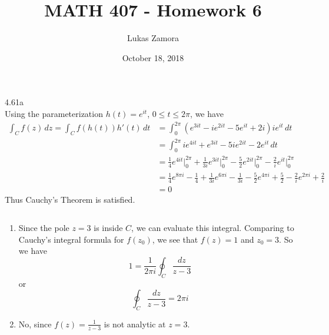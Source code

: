 \documentclass{article}
\title{MATH 407 - Homework 6}
\author{Lukas Zamora}
\date{October 18, 2018}
\theoremstyle{definition}
\begin{document}
    \maketitle
    
    \begin{prob}{4.61a} $  $ \vspace{2mm} \\ 
    	Using the parameterization $ h(t) = e^{it} $, $ 0 \leq t \leq 2\pi $, we have
    	\begin{align*}
    		\int_C f(z) \, dz = \int_C f(h(t))h'(t) \, dt &= \int_{0}^{2\pi} \left( e^{3it} - ie^{2it} - 5e^{it} + 2i \right) ie^{it} \, dt \\
    		&= \int_{0}^{2\pi} ie^{4it} + e^{3it} - 5ie^{2it} - 2e^{it} \, dt \\
    		&= \frac{1}{4} e^{4it} \Big|_{0}^{2\pi} + \frac{1}{3i} e^{3it} \Big|_{0}^{2\pi} - \frac{5}{2} e^{2it} \Big|_{0}^{2\pi} - \frac{2}{i} e^{it} \Big|_{0}^{2\pi} \\
    		&= \frac{1}{4} e^{8\pi i} - \frac{1}{4} + \frac{1}{3i} e^{6\pi i} - \frac{1}{3i} - \frac{5}{2} e^{4\pi i} + \frac{5}{2} - \frac{2}{i} e^{2\pi i} + \frac{2}{i} \\
    		&= 0
    	\end{align*}
    	Thus Cauchy's Theorem is satisfied. \\
    \end{prob}


	\begin{prob}{4.62} $  $
		\begin{enumerate}[label=\alph*.)]
			\item Since the pole $ z = 3 $ is inside $ C $, we can evaluate this integral. Comparing to Cauchy's integral formula for $ f(z_0) $, we see that $ f(z) = 1 $ and $ z_0 = 3 $. So we have 
			\[
				1 = \frac{1}{2\pi i} \oint_C \frac{dz}{z-3}
			\]
			or
			\[
				\oint_C \frac{dz}{z-3} = 2\pi i
			\]
			\item No, since $ f(z) = \frac{1}{z-3} $ is not analytic at $ z=3 $.
		\end{enumerate}
	\end{prob}
\end{document}
